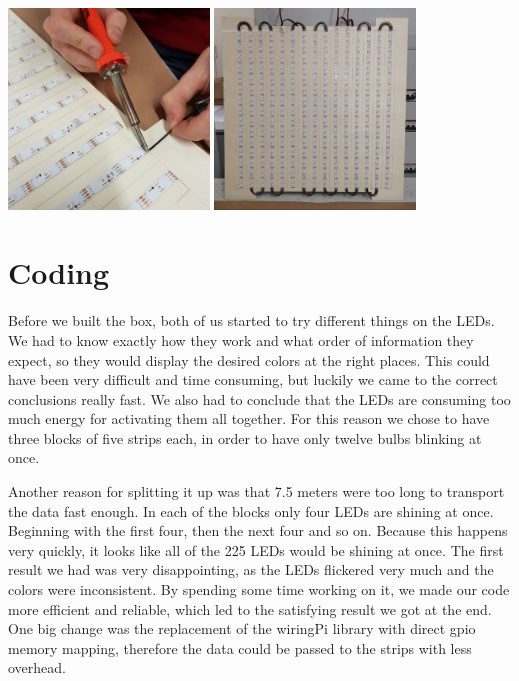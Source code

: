 \documentclass[a4paper,12pt]{article}
\begin{document}
{ \centering
  \includegraphics[width = 0.4\textwidth]{loten.jpg}
  \space{   }
  \includegraphics[width = 0.4\textwidth]{matrix.jpg}
  \\}
 \vspace{1cm}
 
\section{Coding}
Before we built the box, both of us started to try different things on the LEDs.
 We had to know exactly how they work and what order of information they expect, so they would display the desired colors at the right places.
 This could have been very difficult and time consuming, but luckily we came to the correct conclusions really fast.
 We also had to conclude that the LEDs are consuming too much energy for activating them all together.
 For this reason we chose to have three blocks of five strips each, in order to have only twelve bulbs blinking at once.
 
 Another reason for splitting it up was that 7.5 meters were too long to transport the data fast enough.
 In each of the blocks only four LEDs are shining at once. Beginning with the first four, then the next four and so on.
 Because this happens very quickly, it looks like all of the 225 LEDs would be shining at once.
 The first result we had was very disappointing, as the LEDs flickered very much and the colors were inconsistent.
 By spending some time working on it, we made our code more efficient and reliable, which led to the satisfying result we got at the end.
 One big change was the replacement of the wiringPi library with direct gpio memory mapping, therefore the data could be passed to the strips with less overhead.
\end{document}
